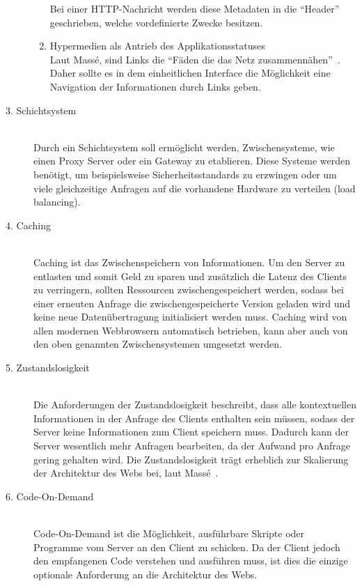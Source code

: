 \begin{description}
\begin{enumerate}
        Bei einer \gls{HTTP}-Nachricht werden diese Metadaten in die ``Header'' 
        geschrieben, welche vordefinierte Zwecke besitzen.

        \item Hypermedien als Antrieb des Applikationsstatuses\hfill \\
        Laut Massé, sind Links die ``Fäden die das Netz zusammennähen''~\cite[][4]{Mas11}.
        Daher sollte es in dem einheitlichen Interface die Möglichkeit eine Navigation
        der Informationen durch Links geben.

    \end{enumerate}

    \item[3. Schichtsystem]\hfill \\
    Durch ein Schichtsystem soll ermöglicht werden, Zwischensysteme, wie einen
    Proxy Server oder ein Gateway zu etablieren. Diese Systeme werden benötigt, 
    um beispielsweise Sicherheitsstandards zu erzwingen oder um viele gleichzeitige
    Anfragen auf die vorhandene Hardware zu verteilen (load balancing).

    \item[4. Caching]\hfill \\
    Caching ist das Zwischenspeichern von Informationen. Um den Server zu entlasten
    und somit Geld zu sparen und zusätzlich die Latenz des Clients zu verringern,
    sollten Ressourcen zwischengespeichert werden, sodass bei einer erneuten 
    Anfrage die zwischengespeicherte Version geladen wird und keine neue 
    Datenübertragung initialisiert werden muss. Caching wird von allen modernen 
    Webbrowsern automatisch betrieben, kann aber auch von den oben genannten
    Zwischensystemen umgesetzt werden.

    \item[5. Zustandslosigkeit]\hfill \\
    Die Anforderungen der Zustandslosigkeit beschreibt, dass alle kontextuellen 
    Informationen in der Anfrage des Clients enthalten sein müssen, sodass der 
    Server keine Informationen zum Client speichern muss. Dadurch kann der Server
    wesentlich mehr Anfragen bearbeiten, da der Aufwand pro Anfrage gering 
    gehalten wird. Die Zustandslosigkeit trägt erheblich zur Skalierung der
    Architektur des Webs bei, laut Massé~\cite[][4]{Mas11}. 

    \item[6. Code-On-Demand]\hfill \\
    Code-On-Demand ist die Möglichkeit, ausführbare Skripte oder Programme vom 
    Server an den Client zu schicken. Da der Client jedoch den empfangenen Code
    verstehen und ausführen muss, ist dies die einzige optionale Anforderung an
    die Architektur des Webs.
\end{description}

